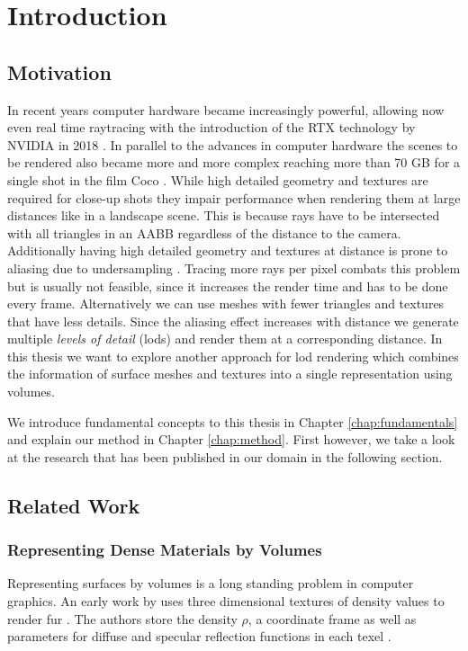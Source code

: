 \chapter{Introduction}
\label{chap:intro}

\section{Motivation}
\label{sect:motivation}
In recent years computer hardware became increasingly powerful, allowing now even real time raytracing with the introduction of the RTX technology by NVIDIA in 2018 \cite{turing_whitepaper}.
In parallel to the advances in computer hardware the scenes to be rendered also became more and more complex reaching more than 70 GB for a single shot in the film Coco \cite{pixarxpu}.
While high detailed geometry and textures are required for close-up shots they impair performance when rendering them at large distances like in a landscape scene.
This is because rays have to be intersected with all triangles in an AABB regardless of the distance to the camera.
Additionally having high detailed geometry and textures at distance is prone to aliasing due to undersampling \cite{pbr}.
Tracing more rays per pixel combats this problem but is usually not feasible, since it increases the render time and has to be done every frame.
Alternatively we can use meshes with fewer triangles and textures that have less details.
Since the aliasing effect increases with distance we generate multiple \textit{levels of detail} (\acsp{lod}) and render them at a corresponding distance.
In this thesis we want to explore another approach for \acl{lod} rendering which combines the information of surface meshes and textures into a single representation using volumes.

We introduce fundamental concepts to this thesis in Chapter \ref{chap:fundamentals} and explain our method in Chapter \ref{chap:method}.
First however, we take a look at the research that has been published in our domain in the following section.

\section{Related Work}
\subsection{Representing Dense Materials by Volumes}
Representing surfaces by volumes is a long standing problem in computer graphics.
An early work by \citeauthor{kajiya_rendering_fur_with_textures} uses three dimensional textures of density values to render fur \cite{kajiya_rendering_fur_with_textures}.
The authors store the density $\rho$, a coordinate frame as well as parameters for diffuse and specular reflection functions in each texel \cite{kajiya_rendering_fur_with_textures}.

